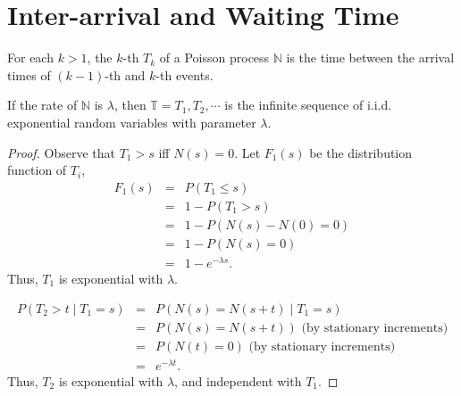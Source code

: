 \section{Inter-arrival and Waiting Time}

\begin{definition}
For each $ k > 1 $, the $ k $-th  $ T_{k} $ of a Poisson process $ \mathbb{N} $ is the time between the arrival times of $ (k - 1) $-th and $ k $-th events.
\end{definition}

\begin{observation} \label{obs:exp_with_lambda}
If the rate of $ \mathbb{N} $ is $ \lambda $, then $ \mathbb{T} = T_{1}, T_{2}, \cdots $ is the infinite sequence of i.i.d. exponential random variables with parameter $ \lambda $.

\begin{proof}
Observe that $ T_{1} > s $ iff $ N(s) = 0 $. Let $ F_{1}(s) $ be the distribution function of $ T_{i} $,
\begin{eqnarray*}
F_{1}(s)
  & = & P(T_{1} \le s) \\
  & = & 1 - P(T_{1} > s) \\
  & = & 1 - P(N(s) - N(0) = 0) \\
  & = & 1 - P(N(s) = 0) \\
  & = & 1 - e^{-\lambda s}.
\end{eqnarray*}
Thus, $ T_{1} $ is exponential with $ \lambda $.

\begin{eqnarray*}
P(T_{2} > t \mid T_{1} = s)
  & = & P(N(s) = N(s + t) \mid T_{1} = s) \\
  & = & P(N(s) = N(s + t)) \text{ (by stationary increments)} \\
  & = & P(N(t) = 0) \text{ (by stationary increments)} \\
  & = & e^{-\lambda t}.
\end{eqnarray*}
Thus, $ T_{2} $ is exponential with $ \lambda $, and independent with $ T_{1} $.
\end{proof}
\end{observation}

